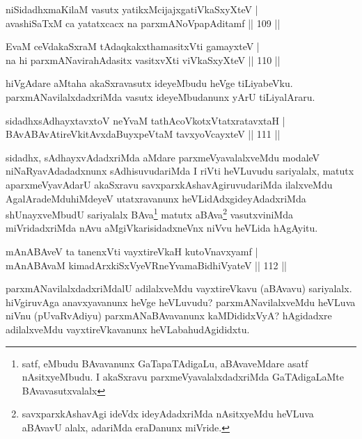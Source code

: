 \begin{shl}
niSidadhxmaKilaM vasutx yatikxMcijajxgatiVkaSxyXteV |\\
avashiSaTxM ca yatatxcacx na parxmANoVpapAditamf \hfill || 109 ||
\end{shl}

\begin{shl}
EvaM ceVdakaSxraM tAdaqkakxthamasitxVti gamayxteV |\\
na hi parxmANavirahAdasitx vasitxvXti viVkaSxyXteV \hfill || 110 ||
\end{shl}

\begin{artha}
hiVgAdare aMtaha akaSxravasutx ideyeMbudu heVge tiLiyabeVku. parxmANavilalxdadxriMda vasutx ideyeMbudanunx yArU tiLiyalAraru.
\end{artha}

\begin{shl}
sidadhxsAdhayxtavxtoV neYvaM tathAcoVkotxVtatxratavxtaH |\\
BAvABAvAtireVkitAvxdaBuyxpeVtaM tavxyoVcayxteV \hfill || 111 ||
\end{shl}

\begin{artha}
sidadhx, sAdhayxvAdadxriMda aMdare parxmeVyavalalxveMdu modaleV niNaRyavAdadadxnunx sAdhisuvudariMda I riVti heVLuvudu sariyalalx, matutx aparxmeVyavAdarU akaSxravu savxparxkAshavAgiruvudariMda ilalxveMdu AgalAradeMdu\break hiMdeyeV utatxravanunx heVLidAdxgideyAdadxriMda shUnayxveMbudU sariyalalx BAva\footnote{satf, eMbudu BAvavanunx GaTapaTAdigaLu, aBAvaveMdare asatf nAsitxyeMbudu. I akaSxravu parxmeVyavalalxdadxriMda GaTAdigaLaMte BAvavasutxvalalx} matutx aBAva\footnote{savxparxkAshavAgi ideVdx ideyAdadxriMda nAsitxyeMdu heVLuva aBAvavU alalx, adariMda eraDanunx miVride.} vasutxviniMda  miVridadxriMda nAvu aMgiVkarisidadxneVnx niVvu heVLida hAgAyitu.
\end{artha}%

\begin{shl}
mAnABAveV ta tanenxVti vayxtireVkaH kutoV\s navxyamf |\\
mAnABAvaM kimadArxkiSxVyeVRneYvamaBidhiVyateV \hfill || 112 ||
\end{shl}

\begin{artha}
parxmANavilalxdadxriMdalU adilalxveMdu vayxtireVkavu (aBAvavu) sariyalalx. hiVgiruvAga anavxyavanunx heVge heVLuvudu? parxmANavilalxveMdu heVLuva niVnu (pUvaRvAdiyu) parxmANaBAvavanunx kaMDididxVyA? hAgidadxre adilalxveMdu vayxtireVkavanunx heVLabahudAgididxtu.
\end{artha}

